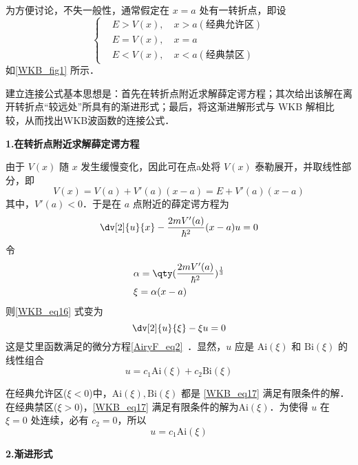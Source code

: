 为方便讨论，不失一般性，通常假定在 $x=a$ 处有一转折点，即设
\begin{equation}
\left\{\begin{aligned}
&E>V(x),\quad x>a(\text{经典允许区})\\
&E=V(x),\quad x=a\\
&E<V(x),\quad x<a(\text{经典禁区})
\end{aligned}\right.
\end{equation}
如\autoref{WKB_fig1} 所示．

建立连接公式基本思想是：首先在转折点附近求解薛定谔方程；其次给出该解在离开转折点“较远处”所具有的渐进形式；最后，将这渐进解形式与 WKB 解相比较，从而找出WKB波函数的连接公式．

\textbf{1.在转折点附近求解薛定谔方程}

由于 $V(x)$ 随 $x$ 发生缓慢变化，因此可在点a处将 $V(x)$ 泰勒展开，并取线性部分，即
\begin{equation}
V(x)=V(a)+V'(a)(x-a)=E+V'(a)(x-a)
\end{equation}
 其中，$V'(a)<0$．于是在 $a$ 点附近的薛定谔方程为
 \begin{equation}\label{WKB_eq16}
 \dv[2]{u}{x}-\frac{2mV'(a)}{\hbar^2}(x-a)u=0
 \end{equation}
令
\begin{equation}
\begin{aligned}
&\alpha=\qty(\frac{2mV'(a)}{\hbar^2})^{\frac{1}{3}}\\
&\xi=\alpha(x-a)
\end{aligned}
\end{equation}
则\autoref{WKB_eq16} 式变为
\begin{equation}\label{WKB_eq17}
\dv[2]{u}{\xi}-\xi u=0
\end{equation}
这是艾里函数满足的微分方程\autoref{AiryF_eq2}~．显然，$u$ 应是 $\mathrm{Ai}(\xi)$ 和 $\mathrm{Bi}(\xi)$ 的线性组合
\begin{equation}
u=c_1 \mathrm{Ai}(\xi)+c_2 \mathrm{Bi}(\xi)
\end{equation}

在经典允许区($\xi<0$)中，$\mathrm{Ai}(\xi),\mathrm{Bi}(\xi)$ 都是 \autoref{WKB_eq17} 满足有限条件的解．在经典禁区($\xi>0$)，\autoref{WKB_eq17} 满足有限条件的解为$\mathrm{Ai}(\xi)$．为使得 $u$ 在 $\xi=0$ 处连续，必有 $c_2=0$，所以
\begin{equation}\label{WKB_eq18}
u=c_1\mathrm{Ai}(\xi)
\end{equation}

\textbf{2.渐进形式}

